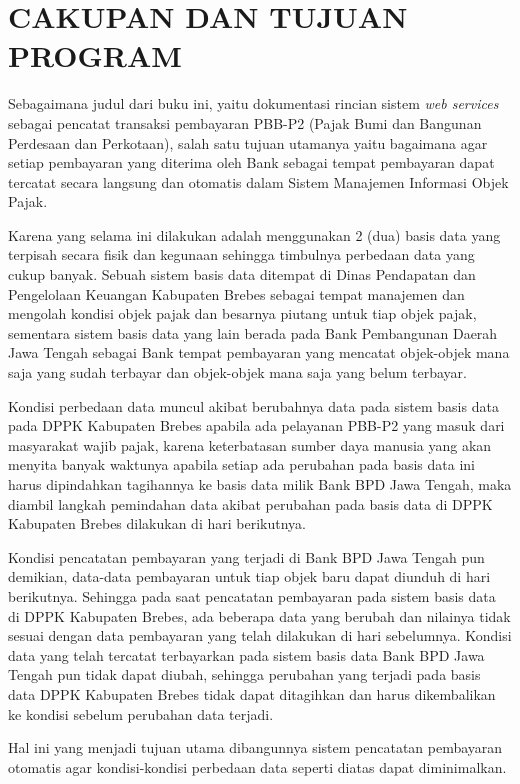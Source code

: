 \chapter{CAKUPAN DAN TUJUAN PROGRAM}

Sebagaimana judul dari buku ini, yaitu dokumentasi rincian sistem \textit{web services} sebagai pencatat transaksi pembayaran PBB-P2 (Pajak Bumi dan Bangunan Perdesaan dan Perkotaan), salah satu tujuan utamanya yaitu bagaimana agar setiap pembayaran yang diterima oleh Bank sebagai tempat pembayaran dapat tercatat secara langsung dan otomatis dalam Sistem Manajemen Informasi Objek Pajak.

Karena yang selama ini dilakukan adalah menggunakan 2 (dua) basis data yang terpisah secara fisik dan kegunaan sehingga timbulnya perbedaan data yang cukup banyak. Sebuah sistem basis data ditempat di Dinas Pendapatan dan Pengelolaan Keuangan Kabupaten Brebes sebagai tempat manajemen dan mengolah kondisi objek pajak dan besarnya piutang untuk tiap objek pajak, sementara sistem basis data yang lain berada pada Bank Pembangunan Daerah Jawa Tengah sebagai Bank tempat pembayaran yang mencatat objek-objek mana saja yang sudah terbayar dan objek-objek mana saja yang belum terbayar.

Kondisi perbedaan data muncul akibat berubahnya data pada sistem basis data pada DPPK Kabupaten Brebes apabila ada pelayanan PBB-P2 yang masuk dari masyarakat wajib pajak, karena keterbatasan sumber daya manusia yang akan menyita banyak waktunya apabila setiap ada perubahan pada basis data ini harus dipindahkan tagihannya ke basis data milik Bank BPD Jawa Tengah, maka diambil langkah pemindahan data akibat perubahan pada basis data di DPPK Kabupaten Brebes dilakukan di hari berikutnya.

Kondisi pencatatan pembayaran yang terjadi di Bank BPD Jawa Tengah pun demikian, data-data pembayaran untuk tiap objek baru dapat diunduh di hari berikutnya. Sehingga pada saat pencatatan pembayaran pada sistem basis data di DPPK Kabupaten Brebes, ada beberapa data yang berubah dan nilainya tidak sesuai dengan data pembayaran yang telah dilakukan di hari sebelumnya. Kondisi data yang telah tercatat terbayarkan pada sistem basis data Bank BPD Jawa Tengah pun tidak dapat diubah, sehingga perubahan yang terjadi pada basis data DPPK Kabupaten Brebes tidak dapat ditagihkan dan harus dikembalikan ke kondisi sebelum perubahan data terjadi.

Hal ini yang menjadi tujuan utama dibangunnya sistem pencatatan pembayaran otomatis agar kondisi-kondisi perbedaan data seperti diatas dapat diminimalkan.